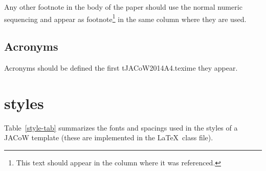 \documentclass[a4paper,
              ]{jacow}
\begin{document}
Any other footnote in the body of the paper should use the normal numeric
sequencing and appear as footnote\footnote{This text should appear
in the column where it was referenced.} in the same column where they are used.

\subsection{Acronyms}

Acronyms should be defined the first tJACoW2014A4.texime they appear.

\section{styles}

Table~\ref{style-tab} summarizes the fonts and spacings used in the styles of
a JACoW template (these are implemented in the \LaTeX\ class file).
\end{document}
